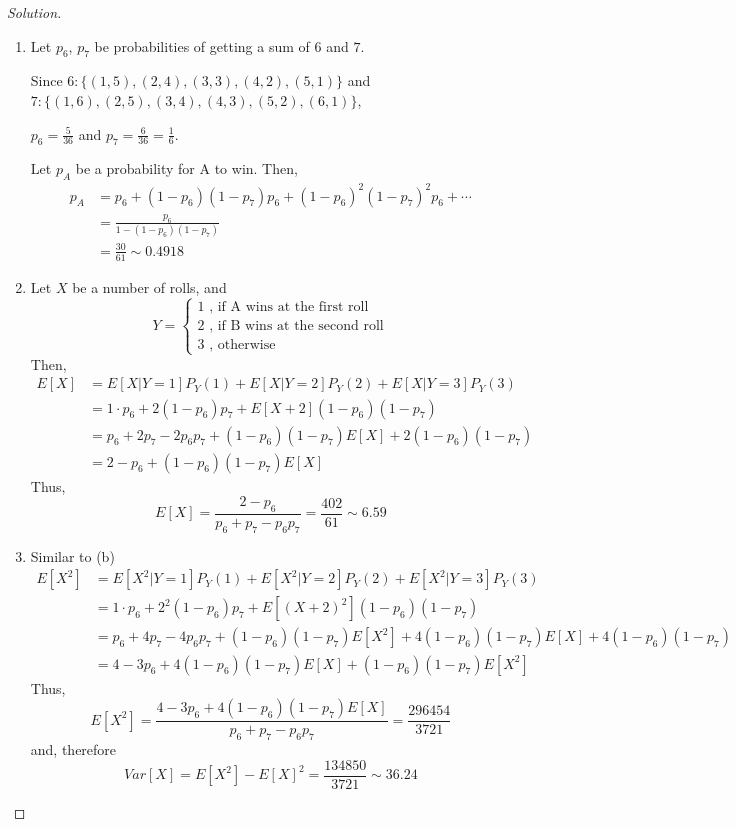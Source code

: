 \documentclass[10pt]{article}
\theoremstyle{definition}
\begin{document}
\begin{proof}[Solution]
\begin{enumerate}[label=(\alph*)]
	\item Let $p_6$, $p_7$ be probabilities of getting a sum of $6$ and $7$.
	
	Since $6:\{(1,5),(2,4),(3,3),(4,2),(5,1)\}$ and $7:\{(1,6),(2,5),(3,4),(4,3),(5,2),(6,1)\}$,
	
	$p_6 = \frac{5}{36}$ and $p_7=\frac{6}{36}=\frac{1}{6}$.
	
	Let $p_A$ be a probability for A to win. Then,
	\begin{align*}
	p_A &= p_6 + (1-p_6)(1-p_7)p_6 + (1-p_6)^2(1-p_7)^2p_6 + \cdots\\
	&= \frac{p_6}{1-(1-p_6)(1-p_7)}\\
	&= \frac{30}{61} \sim 0.4918
	\end{align*}
	
	\item Let $X$ be a number of rolls, and
	\begin{equation*}
	Y=\begin{cases}
	1 \mbox{ , if A wins at the first roll} \\
	2 \mbox{ , if B wins at the second roll}\\
	3 \mbox{ , otherwise}
	\end{cases}
	\end{equation*}
	Then,
	\begin{align*}
	E[X] &= E[X|Y=1]P_Y(1) + E[X|Y=2]P_Y(2) + E[X|Y=3]P_Y(3)\\
	&= 1\cdot p_6 + 2(1-p_6)p_7 + E[X+2](1-p_6)(1-p_7)\\
	&= p_6 + 2p_7 - 2p_6p_7 + (1-p_6)(1-p_7)E[X] + 2(1-p_6)(1-p_7)\\
	&= 2-p_6 + (1-p_6)(1-p_7)E[X]
	\end{align*}
	Thus,
	\begin{equation*}
	E[X] = \frac{2-p_6}{p_6+p_7-p_6p_7}=\frac{402}{61} \sim 6.59
	\end{equation*}

	\item Similar to (b)
	\begin{align*}
		E[X^2] &= E[X^2|Y=1]P_Y(1) + E[X^2|Y=2]P_Y(2) + E[X^2|Y=3]P_Y(3)\\
		&= 1\cdot p_6 + 2^2(1-p_6)p_7 + E[(X+2)^2](1-p_6)(1-p_7)\\
		&= p_6 + 4p_7 - 4p_6p_7 + (1-p_6)(1-p_7)E[X^2] + 4(1-p_6)(1-p_7)E[X]+ 4(1-p_6)(1-p_7)\\
		&= 4-3p_6+4(1-p_6)(1-p_7)E[X] + (1-p_6)(1-p_7)E[X^2]
	\end{align*}
	Thus,
	\begin{equation*}
		E[X^2] = \frac{4-3p_6+4(1-p_6)(1-p_7)E[X]}{p_6+p_7-p_6p_7}=\frac{296454}{3721}
	\end{equation*}
	and, therefore
	\begin{equation*}
	Var[X]=E[X^2]-E[X]^2=\frac{134850}{3721}\sim 36.24
	\end{equation*}
\end{enumerate}


\end{proof}
\end{document}
